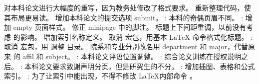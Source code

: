 \markdownRendererUlEnd \markdownRendererInterblockSeparator
{}\markdownRendererInterblockSeparator
{}\markdownRendererInterblockSeparator
{}\markdownRendererUlBegin
\markdownRendererUlItem 对本科论文进行大幅度的重写，因为教务处修改了格式要求。\markdownRendererUlItemEnd 
\markdownRendererUlItem 重新整理代码，使其布局更易读。\markdownRendererUlItemEnd 
\markdownRendererUlItem 增加本科论文的提交选项 submit。\markdownRendererUlItemEnd 
\markdownRendererUlItem {}: 本科的奇偶页眉不同。\markdownRendererUlItemEnd 
\markdownRendererUlItem {}: 增加 empty 页面样式。\markdownRendererUlItemEnd 
\markdownRendererUlItem 修正 minipage 中的脚注。\markdownRendererUlItemEnd 
\markdownRendererUlItem 标题上下间距重调，以前没有考虑  的影响。\markdownRendererUlItemEnd 
\markdownRendererUlItem 增加索引名称定义。\markdownRendererUlItemEnd 
\markdownRendererUlItem 取消  宏包，用基本 LaTeX 命令格式化标题。\markdownRendererUlItemEnd 
\markdownRendererUlItem {}: 取消  宏包，用  调整 目录。\markdownRendererUlItemEnd 
\markdownRendererUlItem 院系和专业分别改名用 department 和 major，代替原来 的 affil 和 subject。\markdownRendererUlItemEnd 
\markdownRendererUlItem {}: 本科论文评语位置调整。\markdownRendererUlItemEnd 
\markdownRendererUlItem {}: 综合论文训练在授权说明之后。\markdownRendererUlItemEnd 
\markdownRendererUlItem {}: 本科论文要求致谢声明分页，但是研究生的不分。\markdownRendererUlItemEnd 
\markdownRendererUlItem {}: 增加插图、表格和公式索引。\markdownRendererUlItemEnd 
\markdownRendererUlItem {}: 为了让索引中能出现，不得不修改 LaTeX内部命令 。\markdownRendererUlItemEnd 
